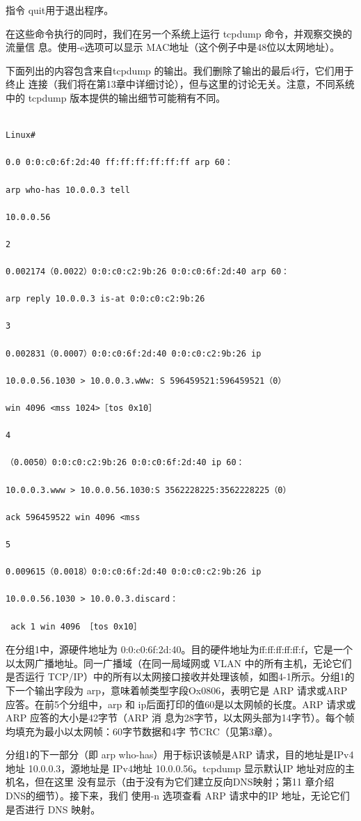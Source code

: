 指令 quit用于退出程序。

在这些命令执行的同时，我们在另一个系统上运行 tcpdump 命令，并观察交换的流量信
息。使用-e选项可以显示 MAC地址（这个例子中是48位以太网地址）。

下面列出的内容包含来自tcpdump 的输出。我们删除了输出的最后4行，它们用于终止
连接（我们将在第13章中详细讨论），但与这里的讨论无关。注意，不同系统中的 tcpdump
版本提供的输出细节可能稍有不同。

\begin{verbatim}
    
Linux#

0.0 0:0:c0:6f:2d:40 ff:ff:ff:ff:ff:ff arp 60：

arp who-has 10.0.0.3 tell

10.0.0.56

2

0.002174（0.0022）0:0:c0:c2:9b:26 0:0:c0:6f:2d:40 arp 60：

arp reply 10.0.0.3 is-at 0:0:c0:c2:9b:26

3

0.002831（0.0007）0:0:c0:6f:2d:40 0:0:c0:c2:9b:26 ip

10.0.0.56.1030 > 10.0.0.3.wWw: S 596459521:596459521（0）

win 4096 <mss 1024>［tos 0x10］

4

（0.0050）0:0:c0:c2:9b:26 0:0:c0:6f:2d:40 ip 60：

10.0.0.3.www > 10.0.0.56.1030:S 3562228225:3562228225（0）

ack 596459522 win 4096 <mss

5

0.009615（0.0018）0:0:c0:6f:2d:40 0:0:c0:c2:9b:26 ip

10.0.0.56.1030 > 10.0.0.3.discard：

 ack 1 win 4096 ［tos 0x10］
\end{verbatim}

在分组1中，源硬件地址为 0:0:c0:6f:2d:40。目的硬件地址为ff:ff:ff:ff:ff:f，它是一个
以太网广播地址。同一广播域（在同一局域网或 VLAN 中的所有主机，无论它们是否运行
TCP/IP）中的所有以太网接口接收并处理该帧，如图4-1所示。分组1的下一个输出字段为
arp，意味着帧类型字段Ox0806，表明它是 ARP 请求或ARP应答。在前5个分组中，arp
和 ip后面打印的值60是以太网帧的长度。ARP 请求或ARP 应答的大小是42字节（ARP 消
息为28字节，以太网头部为14字节）。每个帧均填充为最小以太网帧：60字节数据和4字
节CRC（见第3章）。

分组1的下一部分（即 arp who-has）用于标识该帧是ARP 请求，目的地址是IPv4地址
10.0.0.3，源地址是 IPv4地址 10.0.0.56。tcpdump 显示默认IP 地址对应的主机名，但在这里
没有显示（由于没有为它们建立反向DNS映射；第11 章介绍 DNS的细节）。接下来，我们
使用-n 选项查看 ARP 请求中的IP 地址，无论它们是否进行 DNS 映射。

